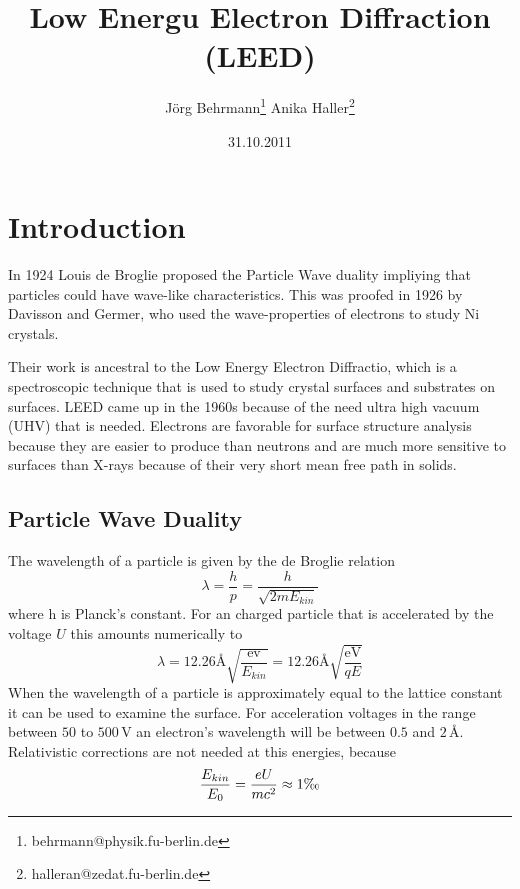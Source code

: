 \documentclass[a4paper,10pt]{scrartcl}
\begin{document}
\title{Low Energu Electron Diffraction (LEED)}
\author{J\"org Behrmann\footnote{behrmann@physik.fu-berlin.de} \qquad Anika Haller\footnote{halleran@zedat.fu-berlin.de}}
\date{31.10.2011}
\maketitle
\tableofcontents
\thispagestyle{empty}

\section{Introduction}

In 1924 Louis de Broglie proposed the Particle Wave duality impliying that particles could have wave-like characteristics. This was proofed in 1926 by Davisson and Germer, who used the wave-properties of electrons to study Ni crystals. 

Their work is ancestral to the Low Energy Electron Diffractio, which is a spectroscopic technique that is used to study crystal surfaces and substrates on surfaces. LEED came up in the 1960s because of the need ultra high vacuum (UHV) that is needed. Electrons are favorable for surface structure analysis because they are easier to produce than neutrons and are much more sensitive to surfaces than X-rays because of their very short mean free path in solids.

\subsection{Particle Wave Duality}

The wavelength of a particle is given by the de Broglie relation
\begin{equation}
\lambda = \frac{h}{p} = \frac{h}{\sqrt{2mE_{kin}}} \label{eq:broglie1}
\end{equation}
where h is Planck's constant. For an charged particle that is accelerated by the voltage $U$ this amounts numerically to
\begin{equation}
\lambda = 12.26 \mbox{\AA} \sqrt{\frac{\mbox{ev}}{E_{kin}}} = 12.26 \mbox{\AA} \sqrt{\frac{\mbox{eV}}{qE}} \label{eq:broglie}
\end{equation}
When the wavelength of a particle is approximately equal to the lattice constant it can be used to examine the surface. For acceleration voltages in the range between $50$ to $500\,$V an electron's wavelength will be between $0.5$ and $2\,$\AA. Relativistic corrections are not needed at this energies, because 
\begin{equation}
\frac{E_{kin}}{E_0}=\frac{eU}{mc^2} \approx 1\mbox{\textperthousand}
\end{equation}
\end{document}
